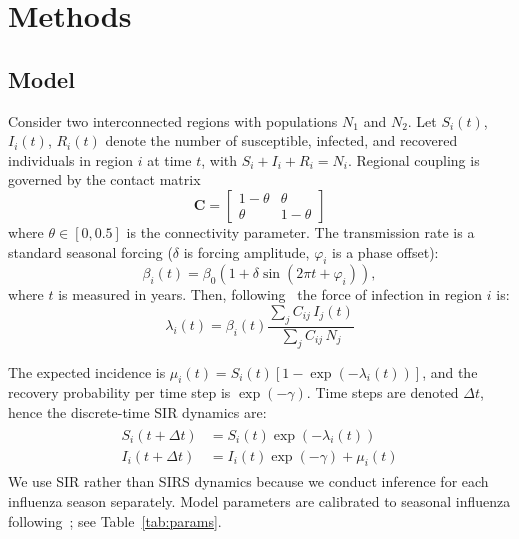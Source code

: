 \section{Methods}

\subsection{Model}\label{subsec:model}

Consider two interconnected regions with populations $N_1$ and $N_2$.
Let $S_i(t)$, $I_i(t)$, $R_i(t)$ denote the number of susceptible,
infected, and recovered individuals in region $i$ at time $t$, with
$S_i + I_i + R_i = N_i$. Regional coupling is governed by the contact
matrix
%
%
$$
\mathbf{C} =
\begin{bmatrix}
  1 - \theta  &     \theta \\
      \theta  & 1 - \theta
\end{bmatrix}
$$
%
%
where $\theta \in [0, 0.5]$ is the connectivity parameter. The
transmission rate is a standard seasonal forcing ($\delta$ is forcing
amplitude, $\varphi_i$ is a phase offset):
%
%
$$
\beta_i(t) = \beta_0(1 + \delta\sin(2\pi t + \varphi_i)),
$$
%
%
where $t$ is measured in years. Then, following~\citet{edlund2011,
  keeling2008} the force of infection in region $i$ is:
\begin{equation}\label{eq:foi}
\lambda_i(t) = \beta_i(t) \frac{\sum_j C_{ij}\, I_j(t)}{\sum_j C_{ij}\, N_j}
\end{equation}

The expected incidence is $\mu_i(t) = S_i(t)[1 -
  \exp(-\lambda_i(t))]$, and the recovery probability per time step is
$\exp(-\gamma)$. Time steps are denoted $\Delta t$, hence the
discrete-time SIR dynamics are:
\begin{align}\begin{split}\label{eq:discrete_sir}
S_i(t+\Delta t) &= S_i(t) \exp(-\lambda_i(t)) \\
I_i(t+ \Delta t) &= I_i(t) \exp(-\gamma) + \mu_i(t)
\end{split}\end{align}
We use SIR rather than SIRS dynamics because we conduct inference for
each influenza season separately. Model parameters are calibrated to
seasonal influenza following~\citet{shaman2010}; see
Table~\ref{tab:params}.

